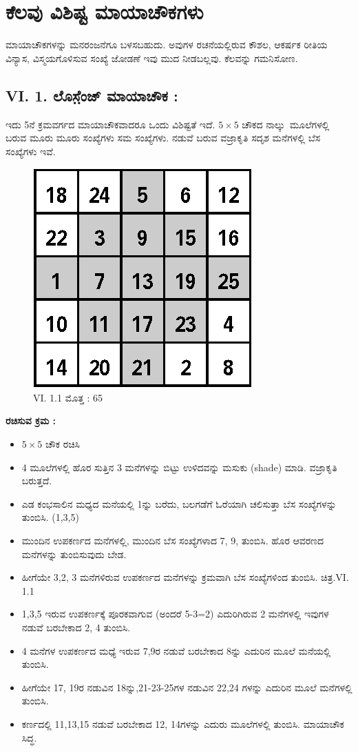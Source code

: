 
\chapter{ಕೆಲವು ವಿಶಿಷ್ಟ ಮಾಯಾಚೌಕಗಳು}

ಮಾಯಾಚೌಕಗಳನ್ನು ಮನರಂಜನೆಗೂ ಬಳಸಬಹುದು. ಅವುಗಳ ರಚನೆಯಲ್ಲಿರುವ ಕೌಶಲ, ಆಕರ್ಷಕ ರೀತಿಯ ವಿನ್ಯಾಸ, ವಿಸ್ಮಯಗೊಳಿಸುವ ಸಂಖ್ಯೆ ಜೋಡಣೆ ಇವು ಮುದ ನೀಡಬಲ್ಲವು. ಕೆಲವನ್ನು ಗಮನಿಸೋಣ.

\section*{VI. 1. ಲೊಸೆ಼ಂಜ್ ಮಾಯಾಚೌಕ :}

ಇದು 5ನೆ ಕ್ರಮವರ್ಗದ ಮಾಯಾಚೌಕವಾದರೂ ಒಂದು ವಿಶಿಷ್ಟತೆ ಇದೆ. $5 \times 5$ ಚೌಕದ \hbox{ನಾಲ್ಕು ಮೂಲೆಗಳಲ್ಲಿ} ಬರುವ ಮೂರು ಮೂರು ಸಂಖ್ಯೆಗಳು ಸಮ ಸಂಖ್ಯೆಗಳು. ನಡುವೆ ಬರುವ ವಜ್ರಾಕೃತಿ ಸದೃಶ ಮನೆಗಳಲ್ಲಿ ಬೆಸ ಸಂಖ್ಯೆಗಳು ಇವೆ.
\begin{figure}[H]
\includegraphics{src/figures/chap5/fig5-1.eps}
\caption*{VI. 1.1 ಮೊತ್ತ : 65}
\end{figure}

\noindent \textbf{ರಚಿಸುವ ಕ್ರಮ :}
\begin{itemize}
	\item $5 \times 5$ ಚೌಕ ರಚಿಸಿ
	\item 4 ಮೂಲೆಗಳಲ್ಲಿ ಹೊರ ಸುತ್ತಿನ 3 ಮನೆಗಳನ್ನು ಬಿಟ್ಟು ಉಳಿದವನ್ನು ಮಸುಕು (shade) ಮಾಡಿ. ವಜ್ರಾಕೃತಿ ಬರುತ್ತದೆ.
	\item ಎಡ ಕಂಭಸಾಲಿನ ಮಧ್ಯದ ಮನೆಯಲ್ಲಿ 1ನ್ನು ಬರೆದು, ಬಲಗಡೆಗೆ ಓರೆಯಾಗಿ ಚಲಿಸುತ್ತಾ ಬೆಸ ಸಂಖ್ಯೆಗಳನ್ನು ತುಂಬಿಸಿ. (1,3,5)
	\item ಮುಂದಿನ ಉಪಕರ್ಣದ ಮನೆಗಳಲ್ಲಿ, ಮುಂದಿನ ಬೆಸ ಸಂಖ್ಯೆಗಳಾದ 7, 9, ತುಂ\-ಬಿಸಿ. ಹೊರ ಆವರಣದ ಮನೆಗಳನ್ನು ತುಂಬಿಸುವುದು ಬೇಡ.
	\item ಹೀಗೆಯೇ 3,2, 3 ಮನೆಗಳಿರುವ ಉಪಕರ್ಣದ ಮನೆಗಳನ್ನು ಕ್ರಮವಾಗಿ ಬೆಸ ಸಂಖ್ಯೆ\-ಗಳಿಂದ ತುಂಬಿಸಿ. ಚಿತ್ರ.VI. 1.1
	\item 1,3,5 ಇರುವ ಉಪಕರ್ಣಕ್ಕೆ ಪೂರಕವಾಗುವ (ಅಂದರೆ 5-3=2) ಎದುರಿಗಿರುವ 2 ಮನೆಗಳಲ್ಲಿ ಇವುಗಳ ನಡುವೆ ಬರಬೇಕಾದ 2, 4 ತುಂಬಿಸಿ.
	\item 4 ಮನೆಗಳ ಉಪಕರ್ಣದ ಮಧ್ಯೆ ಇರುವ 7,9ರ ನಡುವೆ ಬರಬೇಕಾದ 8ನ್ನು ಎದುರಿನ ಮೂಲೆ ಮನೆಯಲ್ಲಿ ತುಂಬಿಸಿ.
	\item ಹೀಗೆಯೇ 17, 19ರ ನಡುವಿನ 18ನ್ನು,21-23-25ಗಳ ನಡುವಿನ 22,24 ಗಳನ್ನು ಎದುರಿನ ಮೂಲೆ ಮನೆಗಳಲ್ಲಿ ತುಂಬಿಸಿ.
	\item ಕರ್ಣದಲ್ಲಿ 11,13,15 ನಡುವೆ ಬರಬೇಕಾದ 12, 14ಗಳನ್ನು ಎದುರು ಮೂಲೆಗಳಲ್ಲಿ ತುಂಬಿಸಿ. ಮಾಯಾಚೌಕ ಸಿದ್ಧ.
\end{itemize}

